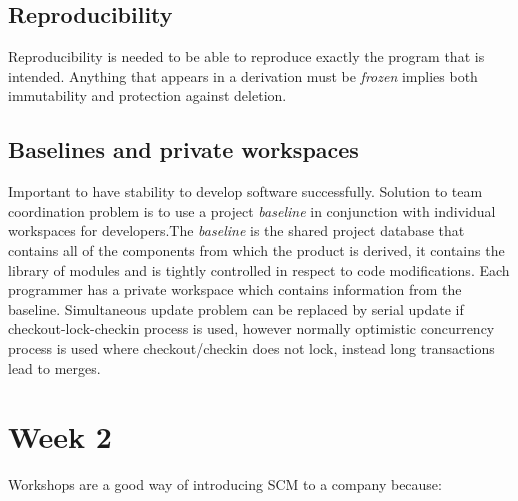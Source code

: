 \subsection{Reproducibility}
Reproducibility is needed to be able to reproduce exactly the program that is intended.
Anything that appears in a derivation must be \textit{frozen} implies both immutability and protection against deletion.

\subsection{Baselines and private workspaces}
Important to have stability to develop software successfully. Solution to team coordination problem is to use a project \textit{baseline} in conjunction with individual workspaces for developers.The \textit{baseline} is the shared project database that contains all of the components from which the product is derived, it contains the library of modules and is tightly controlled in respect to code modifications. Each programmer has a private workspace which contains information from the baseline. Simultaneous update problem can be replaced by serial update if checkout-lock-checkin process is used, however normally optimistic concurrency process is used where checkout/checkin does not lock, instead long transactions lead to merges.

\section{Week 2}
Workshops are a good way of introducing SCM  to a company because:

